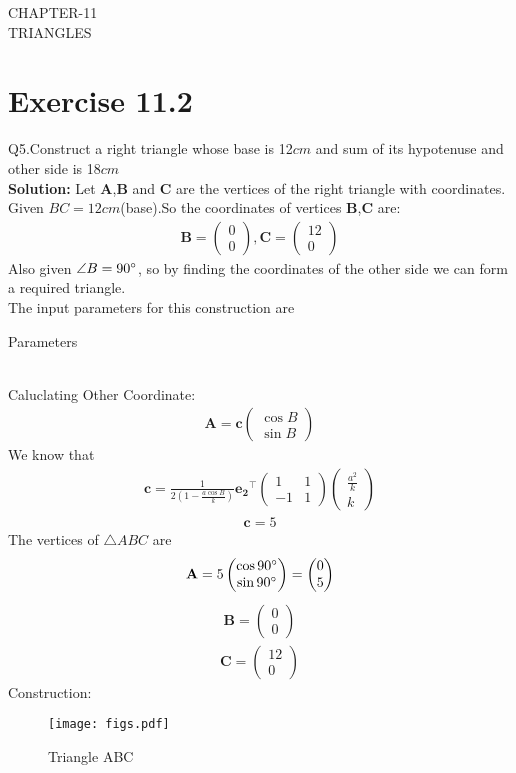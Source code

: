 \documentclass{article}
\newcommand{\myvec}[1]{\ensuremath{\begin{pmatrix}#1\end{pmatrix}}}
\let\vec\mathbf
\begin{document}
\begin{center}
        \textbf\large{CHAPTER-11 \\ TRIANGLES}
\end{center}
\section{Exercise 11.2}
Q5.Construct a right triangle whose base is 12$cm$ and sum of its hypotenuse and other side is 18$cm$ \\
\textbf{Solution:}
Let $\vec{A}$,$\vec{B}$ and $\vec{C}$ are the vertices of the right triangle with coordinates.
Given $BC=12cm$(base).So the coordinates of vertices $\vec{B}$,$\vec{C}$ are:
\begin{align}
{
\vec{B} =\myvec{0\\0},\vec{C} =\myvec{12\\0}
}
\end{align}
Also given $\angle{B}=90\degree$, so by finding the coordinates of the other side we can form a required triangle. \\
 The input parameters for this construction are
 \begin{table}[h]
   \centering
   
   \caption{Parameters}
   \label{tab:Table1}
\end{table}\\
Caluclating Other Coordinate:
  \begin{align}
	  \vec{A} = \vec{c}\myvec{\cos{B} \\ \sin{B}}
   \end{align}
We know that\\
\begin{align}  
	\vec{c} = \frac{1}{2(1-\frac{a\cos{B}}{k})}\vec{e_2}^{\top}\myvec{1 & 1\\-1 & 1}\myvec{\frac{a^2}{k}\\k}
     \end{align}
  \begin{align}
	  \vec{c} = 5
  \end{align}  
The vertices of $\triangle ABC$ are \\
\begin{align}
\vec{A} = 5\myvec{\cos 90\degree\\\sin 90\degree}
  = \myvec{0\\5}
\end{align}
\begin{align}
 \vec{B} = \myvec{0\\0}
\end{align}
\begin{align}
 \vec{C} = \myvec{12\\0}
 \end{align}        
Construction: 
\begin{figure}[h]
 \begin{center}
  \texttt{[image: figs.pdf]}
 \end{center}
 \caption{Triangle ABC}
 \label{fig:Fig1}
\end{figure}
\end{document}
